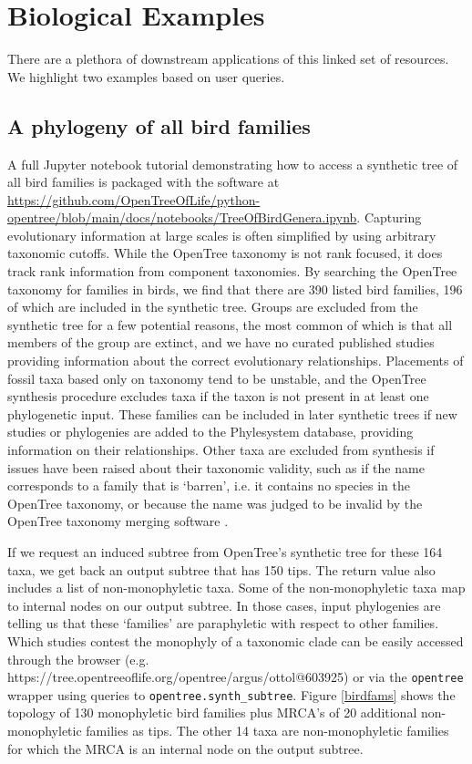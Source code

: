 \documentclass[oupdraft]{sysbio_sse}
\begin{document}
\bigskip

\section{Biological Examples}
\label{sec4}

There are a plethora of downstream applications of this linked set of resources.
We highlight two examples based on user queries.


\subsection{A phylogeny of all bird families}
A full Jupyter notebook tutorial demonstrating how to access a synthetic tree of all bird families is packaged with the software at \url{https://github.com/OpenTreeOfLife/python-opentree/blob/main/docs/notebooks/TreeOfBirdGenera.ipynb}.
Capturing evolutionary information at large scales is often simplified by using arbitrary taxonomic cutoffs.
While the OpenTree taxonomy is not rank focused, it does track rank information from component taxonomies.
By searching the OpenTree taxonomy for families in birds, we find that there are 390 listed bird families, 196 of which are included in the synthetic tree.
Groups are excluded from the synthetic tree for a few potential reasons, the most common of which is that all members of the group are extinct, and we have no curated published studies providing information about the correct evolutionary relationships.
Placements of fossil taxa based only on taxonomy tend to be unstable, and the OpenTree synthesis procedure excludes taxa if the taxon is not present in at least one  phylogenetic input.
These families can be included in later synthetic trees if new studies or phylogenies are added to the Phylesystem database, providing information on their relationships.
Other taxa are excluded from synthesis if issues have been raised about their taxonomic validity, such as if the name corresponds to a family that is `barren', i.e. it contains no species in the OpenTree taxonomy, or because the name was judged to be invalid by the OpenTree taxonomy merging software \citep{rees_automated_2017}.

If we request an induced subtree from OpenTree's synthetic tree for these 164 taxa, we get back an output subtree that has 150 tips. The return value also includes a list of non-monophyletic taxa.
Some of the non-monophyletic taxa map to internal nodes on our output subtree. In those cases, input phylogenies are telling us that these `families' are paraphyletic with respect to other families. Which studies contest the monophyly of a taxonomic clade can be easily accessed through the browser (e.g. https://tree.opentreeoflife.org/opentree/argus/ottol@603925) or via the \texttt{opentree} wrapper using queries to \texttt{opentree.synth\_subtree}. Figure \ref{birdfams} shows the topology of 130 monophyletic bird families plus MRCA's of 20 additional non-monophyletic families as tips. The other 14 taxa are non-monophyletic families for which the MRCA is an internal node on the output subtree.
\end{document}
